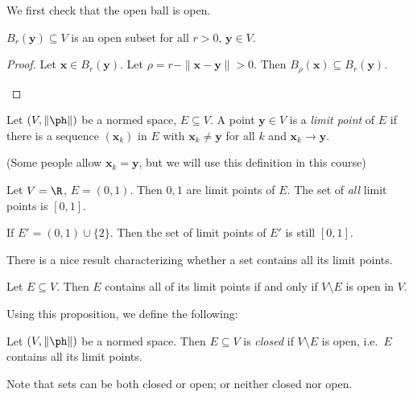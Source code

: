 \documentclass[a4paper]{article}
\begin{document}
We first check that the open ball is open.
\begin{prop}
  $B_r(\mathbf{y})\subseteq V$ is an open subset for all $r > 0$, $\mathbf{y} \in V$.
\end{prop}

\begin{proof}
  Let $\mathbf{x} \in B_r(\mathbf{y})$. Let $\rho = r - \|\mathbf{x} - \mathbf{y}\| > 0$. Then $B_\rho(\mathbf{x}) \subseteq B_r(\mathbf{y})$.
  \begin{center}
  \end{center}
\end{proof}

\begin{defi}
  Let $(V, \|\ph\|)$ be a normed space, $E\subseteq V$. A point $\mathbf{y} \in V$ is a \emph{limit point} of $E$ if there is a sequence $(\mathbf{x}_k)$ in $E$ with $\mathbf{x}_k \not= \mathbf{y}$ for all $k$ and $\mathbf{x}_k \to \mathbf{y}$.
\end{defi}
(Some people allow $\mathbf{x}_k = \mathbf{y}$, but we will use this definition in this course)

\begin{eg}
  Let $V = \R$, $E = (0, 1)$. Then $0, 1$ are limit points of $E$. The set of \emph{all} limit points is $[0, 1]$.

  If $E' = (0, 1) \cup \{2\}$. Then the set of limit points of $E'$ is still $[0, 1]$.
\end{eg}

There is a nice result characterizing whether a set contains all its limit points.
\begin{prop}
  Let $E\subseteq V$. Then $E$ contains all of its limit points if and only if $V\setminus E$ is open in $V$.
\end{prop}

Using this proposition, we define the following:
\begin{defi}
  Let $(V, \|\ph\|)$ be a normed space. Then $E\subseteq V$ is \emph{closed} if $V\setminus E$ is open, i.e.\ $E$ contains all its limit points.
\end{defi}
Note that sets can be both closed or open; or neither closed nor open.
\end{document}
